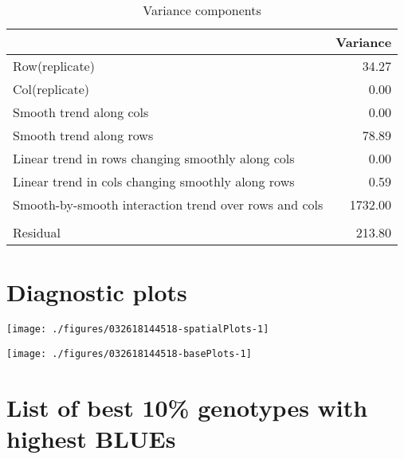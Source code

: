 \documentclass[a4paper,11pt]{article}\usepackage[]{graphicx}\usepackage[]{color}
\newenvironment{knitrout}{}{} %
\begin{document}
\begin{table}[ht]
\begin{flushleft}
\caption{Variance components} 
\label{varComps}
\begin{tabular}{lr}
  \hline
 & Variance \\ 
  \hline
Row(replicate) & 34.27 \\ 
  Col(replicate) & 0.00 \\ 
  Smooth trend along cols & 0.00 \\ 
  Smooth trend along rows & 78.89 \\ 
  Linear trend in rows changing smoothly along cols & 0.00 \\ 
  Linear trend in cols changing smoothly along rows & 0.59 \\ 
  Smooth-by-smooth interaction trend over rows and cols & 1732.00 \\ 
   &  \\ 
  Residual & 213.80 \\ 
   \hline
\end{tabular}
\end{flushleft}
\end{table}

\clearpage

\section{Diagnostic plots}

\texttt{[image: ./figures/032618144518-spatialPlots-1]} 

\begin{knitrout}
\color{fgcolor}
\texttt{[image: ./figures/032618144518-basePlots-1]} 

\end{knitrout}
\newpage

\section{List of best 10\% genotypes with
highest BLUEs}
\end{document}
